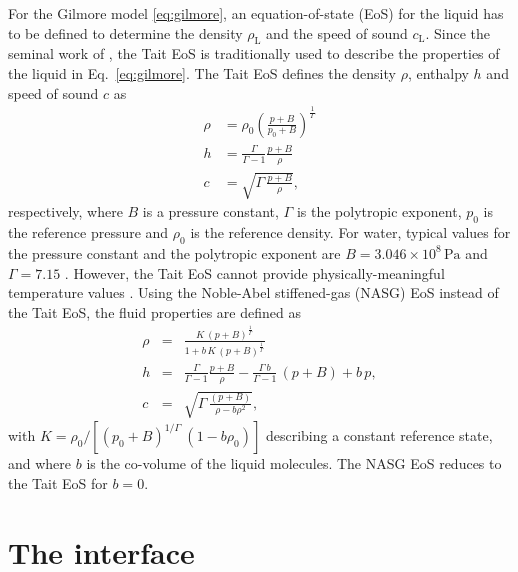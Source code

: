 For the Gilmore model \eqref{eq:gilmore}, an equation-of-state (EoS) for the liquid has to be defined to determine the density $\rho_\text{L}$ and the speed of sound $c_\text{L}$. Since the seminal work of \citet{Gilmore1952}, the Tait EoS is traditionally used to describe the properties of the liquid in Eq.~\eqref{eq:gilmore}. The Tait EoS defines the density $\rho$, enthalpy $h$ and speed of sound $c$ as
\begin{align}
    \rho &= \rho_0 \left( \frac{p+B}{p_0+B}\right)^{\frac{1}{\Gamma}} \label{eq:rho_Tait} \\
    h &= \frac{\Gamma}{\Gamma-1} \frac{p+B}{\rho} \label{eq:h_Tait} \\
    c &= \sqrt{\Gamma \, \frac{p+B}{\rho}}, \label{eq:c_Tait}
\end{align}
respectively, where $B$ is a pressure constant, $\Gamma$ is the polytropic exponent, $p_0$ is the reference pressure and $\rho_0$ is the reference density. For water, typical values for the pressure constant and the polytropic exponent are $B=3.046 \times 10^8 \, \text{Pa}$ and $\Gamma=7.15$ \citep{Gilmore1952}. However, the Tait EoS cannot provide physically-meaningful temperature values \citep{Radulescu2020}. 
Using the Noble-Abel stiffened-gas (NASG) EoS \citep{LeMetayer2016} instead of the Tait EoS, the fluid properties are defined as \citep{Denner2021}
 \begin{eqnarray}
    \rho &=& \frac{K \, (p+B)^{\frac{1}{\Gamma}}}{1+b \, K \,  (p+B)^{\frac{1}{\Gamma}}} \label{eq:rho_NASG}\\
      h &=& \frac{\Gamma}{\Gamma-1} \frac{p+B}{\rho} - \frac{\Gamma \, b}{\Gamma-1} \, (p+B) + b \, p
      , \label{eq:h_NASG} \\
      c &=&\sqrt{\Gamma \, \frac{(p+B)}{\rho-b  \rho^2}},\label{eq:c_NASG}
    \end{eqnarray}
with $K = \rho_0/[(p_0+B)^{{1/\Gamma}} \ (1-b \rho_0)]$ describing a constant reference state, and where $b$ is the co-volume of the liquid molecules. The NASG EoS reduces to the Tait EoS for $b=0$.

\section{The interface}
\label{sec:interface}

\vspace{0.8em}

